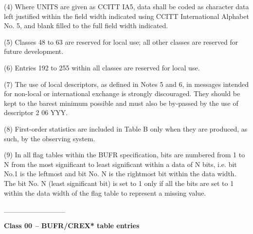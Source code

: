 (4) Where UNITS are given as CCITT IA5, data shall be coded as character data left justified within the field width indicated using CCITT International Alphabet No. 5, and blank filled to the full field width indicated.

(5) Classes 48 to 63 are reserved for local use; all other classes are reserved for future development.

(6) Entries 192 to 255 within all classes are reserved for local use.

(7) The use of local descriptors, as defined in Notes 5 and 6, in messages intended for non-local or international exchange is strongly discouraged. They should be kept to the barest minimum possible and must also be by-passed by the use of descriptor 2 06 YYY.

(8) First-order statistics are included in Table B only when they are produced, as such, by the observing system.

(9) In all flag tables within the BUFR specification, bits are numbered from 1 to N from the most significant to least significant within a data of N bits, i.e. bit No.1 is the leftmost and bit No. N is the rightmost bit within the data width. The bit No. N (least significant bit) is set to 1 only if all the bits are set to 1 within the data width of the flag table to represent a missing value.

\_\_\_\_\_\_\_\_\_\_\_\_

\textbf{Class 00 \emph{--} BUFR/CREX* table entries}

